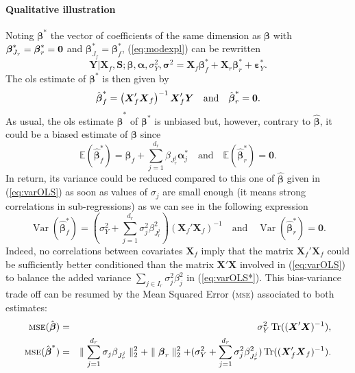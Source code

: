 \documentclass[11pt,a4paper]{article}
\begin{document}
\paragraph{Qualitative illustration} Noting $\boldsymbol{\beta}^*$ the vector of coefficients of the same dimension as $\boldsymbol{\beta}$ with $\boldsymbol{\beta}_{J_r}^*=\boldsymbol{\beta}_{r}^*={\bf 0}$ and $\boldsymbol{\beta}_{J_f}^*=\boldsymbol{\beta}_{f}^*$, (\ref{eq:modexpl}) can be rewritten
\begin{equation}
	\boldsymbol{Y}{|\boldsymbol{X}_f,\boldsymbol{S}};\boldsymbol{\beta},\boldsymbol{\alpha},\sigma_Y^2,\boldsymbol{\sigma}^2=\boldsymbol{X}_f\boldsymbol{\beta}_f^*+\boldsymbol{X}_r\boldsymbol{\beta}_r^*+\boldsymbol{\varepsilon}_Y^*.\label{eq:modexpl2}
\end{equation}
The {\sc ols} estimate of $\boldsymbol{\beta}^*$ is then given by
	\begin{equation}
		\hat{\boldsymbol{\beta}}^*_f=\left(\boldsymbol{X}_f'\boldsymbol{X}_f \right) ^{-1}\boldsymbol{X}_f'\boldsymbol{Y} \quad \mbox{and} \quad \hat{\boldsymbol{\beta}}^*_r = {\bf 0}.
	\end{equation}
As usual, the {\sc ols} estimate $\hat{\boldsymbol{\beta}}^*$ of $\boldsymbol{\beta}^*$ is unbiased but, however, contrary to $\hat{\boldsymbol{\beta}}$, it could be a biased estimate of $\boldsymbol{\beta}$ since
		\begin{equation}
			\mathbb{E}(\hat{\boldsymbol{\beta}}_f^*)=\boldsymbol{\beta}_f+\sum_{j =1}^{d_r}\beta_{J_r^j}\boldsymbol{\alpha}_j^* \quad \textrm{and}\quad \mathbb{E}(\hat{\boldsymbol{\beta}}_r^*)=\boldsymbol{0}.
		\end{equation}
In return, its variance could be reduced compared to this one of $\hat{\boldsymbol{\beta}}$ given in (\ref{eq:varOLS}) as soon as values of $\sigma_j$ are small enough (it means strong correlations in sub-regressions) as we can see in the following expression
		\begin{equation}
			\operatorname{Var}(\hat{\boldsymbol{\beta}}_f^*)= (\sigma^2_Y+\sum_{j =1}^{d_r}\sigma^2_{j}\beta_{J_r^j}^2)(\boldsymbol{X}_f' \boldsymbol{X}_f)^{-1} \quad \textrm{and} \quad\operatorname{Var}(\hat{\boldsymbol{\beta}}_r^*)= \boldsymbol{0}. \label{eq:varOLS*}
		\end{equation}
Indeed, no correlations between covariates $\boldsymbol{X}_f$ imply that the matrix $\boldsymbol{X}_f' \boldsymbol{X}_f$ could be sufficiently better conditioned than the matrix $\boldsymbol{X}' \boldsymbol{X}$ involved in (\ref{eq:varOLS}) to balance the added variance $\sum_{j \in I_r}\sigma^2_{j}\beta_{j}^2$ in (\ref{eq:varOLS*}). This bias-variance trade off can be resumed by the Mean Squared Error (\textsc{mse}) associated to both estimates:
	\begin{eqnarray}
			\textsc{mse}(\hat{\boldsymbol{\beta}})&=& \sigma_Y^2 \operatorname{Tr}((\boldsymbol{X}'\boldsymbol{X})^{-1}),
			 \\
			\textsc{mse}(\hat{\boldsymbol{\beta}}^*)&=& \parallel\sum_{j =1}^{d_r}\sigma_{j}\beta_{J_r^j} \parallel_2^2 +\parallel \boldsymbol{\beta}_r\parallel^2_2 + (\sigma^2_Y+\sum_{j =1}^{d_r}\sigma^2_{j}\beta_{J_r^j}^2 ) \operatorname{Tr}((\boldsymbol{X}_f' \boldsymbol{X}_f)^{-1}).
	\end{eqnarray}	 
\end{document}

